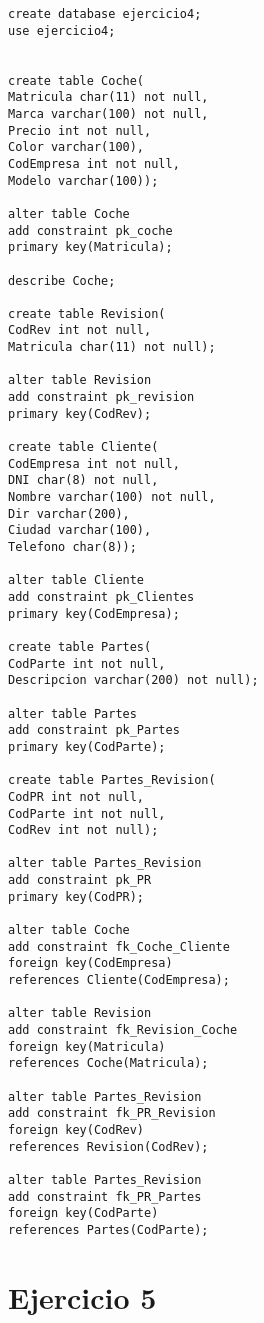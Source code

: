 \documentclass[a4paper,12pt]{article}
\begin{document}
\begin{lstlisting}
create database ejercicio4;
use ejercicio4;


create table Coche(
Matricula char(11) not null,
Marca varchar(100) not null,
Precio int not null,
Color varchar(100),
CodEmpresa int not null,
Modelo varchar(100));

alter table Coche
add constraint pk_coche
primary key(Matricula);

describe Coche;

create table Revision(
CodRev int not null,
Matricula char(11) not null);

alter table Revision
add constraint pk_revision
primary key(CodRev);

create table Cliente(
CodEmpresa int not null,
DNI char(8) not null,
Nombre varchar(100) not null,
Dir varchar(200),
Ciudad varchar(100),
Telefono char(8));

alter table Cliente
add constraint pk_Clientes
primary key(CodEmpresa);

create table Partes(
CodParte int not null,
Descripcion varchar(200) not null);

alter table Partes
add constraint pk_Partes
primary key(CodParte);

create table Partes_Revision(
CodPR int not null,
CodParte int not null,
CodRev int not null);

alter table Partes_Revision
add constraint pk_PR
primary key(CodPR);

alter table Coche
add constraint fk_Coche_Cliente
foreign key(CodEmpresa)
references Cliente(CodEmpresa);

alter table Revision
add constraint fk_Revision_Coche
foreign key(Matricula)
references Coche(Matricula);

alter table Partes_Revision
add constraint fk_PR_Revision
foreign key(CodRev)
references Revision(CodRev);

alter table Partes_Revision
add constraint fk_PR_Partes
foreign key(CodParte) 
references Partes(CodParte);
\end{lstlisting}

\section{Ejercicio 5}
\end{document}
